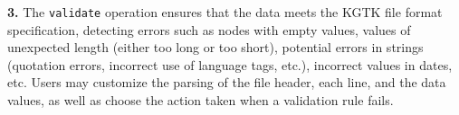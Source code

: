 \documentclass[runningheads]{llncs}
\newcommand{\kibitz}[2]{%
{\color{#1}#2}{}%
}
\newcommand{\DS}[1]{\kibitz{blue}{[DS: #1]}} %
\newcommand{\DG}[1]{\kibitz{red}{[DG: #1]}} %
\begin{document}

\textbf{3. } %
The \texttt{validate} operation ensures that the data meets the KGTK file format specification, detecting errors such as nodes with empty values, values of unexpected length (either too long or too short), potential errors in strings (quotation errors, incorrect use of language tags, etc.), incorrect values in dates, etc. Users may customize the parsing of the file header, each line, and the data values, as well as choose the action taken when a validation rule fails.




\end{document}
